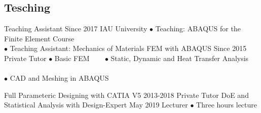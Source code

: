 \documentclass[
	a4paper,
]{ThirtyNinesecondscv}
\begin{document}
\subsection{Tesching}
\begin{cvtable}[1.5]
	\customcvitem
                    {\faBriefcase}
                    {Teaching Assistant}
                    {Since 2017}
                    {IAU University}
                    {
                    $\bullet$ Teaching: ABAQUS for the Finite Element Course\\
                    $\bullet$ Teaching Assistant: Mechanics of Materials
                        }
        \customcvitem
            	{\faBriefcase}
                    {FEM with ABAQUS}
                    {Since 2015}
                    {Private Tutor}
                    {
                    $\bullet$ Basic FEM ~~~ $\bullet$ Static, Dynamic and Heat Transfer Analysis ~~~ \\$\bullet$ CAD and Meshing in ABAQUS 
                    }
   
	\customcvitem
        	   	{\faBriefcase}
                    {Full Parameteric Designing with CATIA V5}
                    {2013-2018}
                    {Private Tutor}
                    {
                      }
	\customcvitem
        		{\faBriefcase}
                    {DoE and Statistical Analysis with Design-Expert}
                    {May 2019}
                    {Lecturer}
                    {$\bullet$ Three hours lecture }
    
\end{cvtable}
\end{document}
